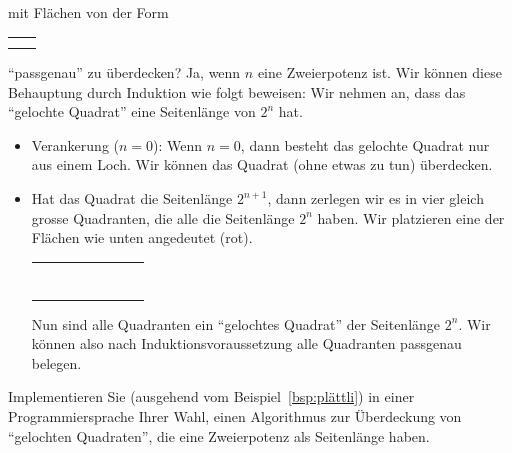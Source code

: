 \begin{example}
mit Flächen von der Form
\begin{tabular}{ c c }
&\cellcolor{black}\\
\cellcolor{black}&\cellcolor{black}
\end{tabular}
``passgenau'' zu überdecken? Ja, wenn $n$ eine Zweierpotenz ist. Wir können diese Behauptung durch Induktion wie folgt beweisen:  Wir nehmen an, dass das ``gelochte Quadrat'' eine Seitenlänge von $2^n$ hat.
\begin{itemize}
\item Verankerung ($n=0$): Wenn $n=0$, dann besteht das gelochte Quadrat nur aus einem Loch. Wir können das Quadrat (ohne etwas zu tun) überdecken.
\item Hat das Quadrat die Seitenlänge $2^{n+1}$, dann zerlegen wir es in vier gleich grosse Quadranten, die alle die Seitenlänge $2^n$ haben. Wir platzieren eine der Flächen wie unten angedeutet (rot).
\begin{center}
\begin{tabular}{ | c | c | c | c !{\color{red}\vrule} c  | c | c | c | }
\hline
&&&&&&&\\
\hline
&&&&&&&\\
\hline
&&&&&&&\\
\hline
&&&&&&&\\
\hline
{}&&&&&&&\\
\hline
&&&&&&&\\
\hline
&&&&&&&\\
\hline
&&&&&&&\\
\hline
\end{tabular}
\end{center}
Nun sind alle Quadranten ein ``gelochtes Quadrat'' der Seitenlänge $2^n$. Wir können also nach Induktionsvoraussetzung alle Quadranten passgenau belegen.
\end{itemize}
\end{example}

\begin{example}
Implementieren Sie (ausgehend vom Beispiel~\ref{bsp:plättli}) in einer Programmiersprache Ihrer Wahl, einen Algorithmus zur Überdeckung von ``gelochten Quadraten'', die eine Zweierpotenz als Seitenlänge haben.
\end{example}